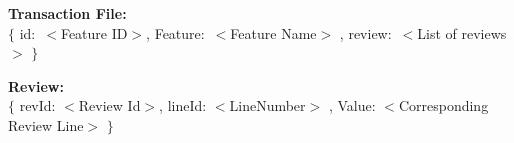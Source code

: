 \textbf{Transaction File:}\\
$\{$  id$:$ $<$Feature ID$>$, Feature$:$ $<$Feature Name$>$ , review$:$ $<$List of reviews $>$ $\}$

\textbf{Review:}\\
$\{$ revId: $<$Review Id$>$, lineId: $<$LineNumber$>$ , Value: $<$Corresponding Review Line$>$ $\}$

